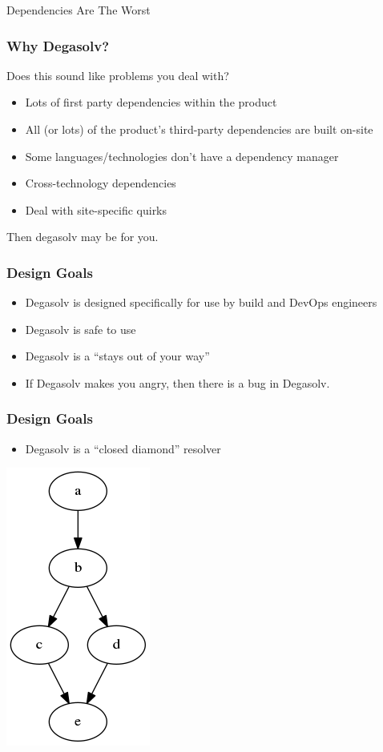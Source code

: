 \documentclass{beamer}
\begin{document}
\begin{frame}[fragile]
  \centerline{\color{blue}\Large Dependencies Are The Worst}
\end{frame}
\begin{frame}
  \frametitle{Why Degasolv?}

  Does this sound like problems you deal with?

  \break

  \begin{itemize}
  \item Lots of first party dependencies within the product
  \item All (or lots) of the product's third-party dependencies are built on-site
  \item Some languages/technologies don't have a dependency manager
  \item Cross-technology dependencies
  \item Deal with site-specific quirks
  \end{itemize}

  \break

  Then degasolv may be for you.

\end{frame}
\begin{frame}
  \frametitle{Design Goals}
  \begin{itemize}
  \item Degasolv is designed specifically for use by build and DevOps engineers
  \item Degasolv is safe to use
  \item Degasolv is a ``stays out of your way''
  \item If Degasolv makes you angry, then there is a bug in Degasolv.
  \end{itemize}
\end{frame}
\begin{frame}
  \frametitle{Design Goals}
  \begin{itemize}
    \item Degasolv is a ``closed diamond'' resolver
  \end{itemize}
  \centerline{\includegraphics[scale=0.5]{diamonddep.png}}
\end{frame}
\end{document}
